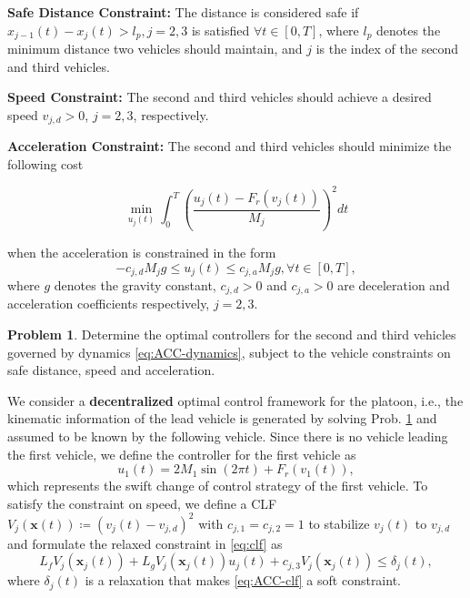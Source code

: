 \documentclass[letterpaper, 10 pt, conference]{ieeeconf}
\theoremstyle{definition}
\newtheorem{problem}{Problem}
\begin{document}
\textbf{Safe Distance Constraint:} The distance is considered safe if $x_{j-1}(t)-x_{j}(t)>l_{p},j=2,3$ is satisfied $\forall t \in [0,T]$, where $l_{p}$ denotes the minimum distance two vehicles should maintain, and $j$ is the index of the second and third vehicles.  

\textbf{Speed Constraint:} The second and third vehicles should achieve a desired speed $v_{j,d}>0$, $j=2,3$, respectively.

\textbf{Acceleration Constraint:} The second and third vehicles should minimize the following cost
\begin{small}
\begin{equation}
\label{eq:minimal-u}
\min_{u_{j}(t)} \int_{0}^{T}(\frac{u_{j}(t)-F_{r}(v_{j}(t))}{M_{j}})^{2}dt 
\end{equation}
\end{small}
when the acceleration is constrained in the form 
\begin{equation}
\label{eq:constraint-u}
-c_{j,d}M_{j}g\le u_{j}(t) \le c_{j,a}M_{j}g, \forall t \in [0,T], 
\end{equation}
where $g$ denotes the gravity constant, $c_{j,d}>0$ and $c_{j,a}>0$ are deceleration and acceleration coefficients respectively, $j=2,3.$

\begin{problem}
\label{prob:ACC-prob}
Determine the optimal controllers for the second and third vehicles governed by dynamics \eqref{eq:ACC-dynamics}, subject to the vehicle constraints on safe distance, speed and acceleration. 
\end{problem}

We consider a \textbf{decentralized} optimal control framework for the platoon, i.e., the kinematic information of the lead vehicle is generated by solving Prob. \ref{prob:ACC-prob} and assumed to be known by the following vehicle. Since there is no vehicle leading the first vehicle, we define the controller for the first vehicle as
\begin{equation}
\label{eq:first vehicle controller}
u_{1}(t)=2M_{1}\sin(2\pi t)+F_{r}(v_{1}(t)),
\end{equation}
which represents the swift change of control strategy of the first vehicle. To satisfy the constraint on speed, we define a CLF $V_{j}(\boldsymbol{x}(t)) \coloneqq(v_{j}(t)-v_{j,d})^{2}$ with $c_{j,1}=c_{j,2}=1$ to stabilize $v_{j}(t)$ to $v_{j,d}$ and formulate the relaxed constraint in \eqref{eq:clf} as
\begin{equation}
\label{eq:ACC-clf}
L_{f}V_{j}(\boldsymbol{x}_{j}(t))+L_{g}V_{j}(\boldsymbol{x}_{j}(t))u_{j}(t)+c_{j,3}V_{j}(\boldsymbol{x}_{j}(t))\le \delta_{j}(t), 
\end{equation}
where $\delta_{j}(t)$ is a relaxation that makes \eqref{eq:ACC-clf} a soft constraint.
\end{document}
